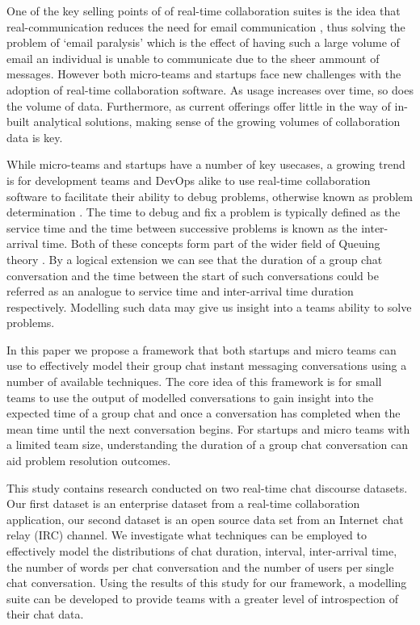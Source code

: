 One of the key selling points of of real-time collaboration suites is the idea that real-communication reduces the need for email communication \cite{emailclutter}, thus solving the problem of `email paralysis' \cite{emailparal} which is the effect of having such a large volume of email an individual is unable to communicate due to the sheer ammount of messages. However both micro-teams and startups face new challenges with the adoption of real-time collaboration software. As usage increases over time, so does the volume of data. Furthermore, as current offerings offer little in the way of in-built analytical solutions, making sense of the growing volumes of collaboration data is key.  

While micro-teams and startups have a number of key usecases, a growing trend is for development teams and DevOps alike to use real-time collaboration software to facilitate their ability to debug problems, otherwise known as problem determination \cite{devslack} \cite{devopsslack}. The time to debug and fix a problem is typically defined as the service time and the time between successive problems is known as the inter-arrival time. Both of these concepts form part of the wider field of Queuing theory  \cite{kleinrock1975queuing}. By a logical extension we can see that the duration of a group chat conversation and the time between the start of such conversations could be referred as an analogue to service time and inter-arrival time duration respectively. Modelling such data may give us insight into a teams ability to solve problems. \par 

In this paper we propose a framework that both startups and micro teams can use to effectively model their group chat instant messaging conversations using a number of available techniques. The core idea of this framework is for small teams to use the output of modelled conversations to gain insight into the expected time of a group chat and once a conversation has completed when the mean time until the next conversation begins. For startups and micro teams with a limited team size, understanding the duration of a group chat conversation can aid problem resolution outcomes. \par

This study contains research conducted on two real-time chat discourse datasets. Our first dataset is an enterprise dataset from a real-time collaboration application, our second dataset is an open source data set from an Internet chat relay (IRC) channel. We investigate what techniques can be employed to effectively model the distributions of chat duration, interval, inter-arrival time, the number of words per chat conversation and the number of  users per single chat conversation. Using the results of this study for our framework, a modelling suite can be developed to provide teams with a greater level of introspection of their chat data. \par

